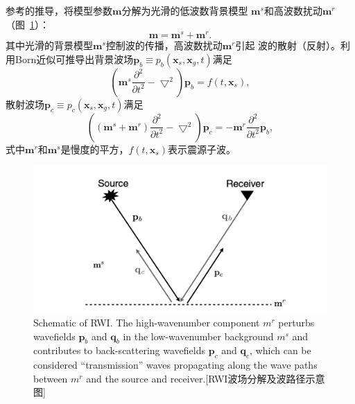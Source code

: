 参考的推导，将模型参数$\mathbf{m}$分解为光滑的低波数背景模型
$\mathbf{m}^s$和高波数扰动$\mathbf{m}^r$（图~\ref{fig:schematic_rwi}）：
\begin{equation}
	\mathbf{m}=\mathbf{m}^s+\mathbf{m}^r.
\end{equation}
其中光滑的背景模型$\mathbf{m}^s$控制波的传播，高波数扰动$\mathbf{m}^r$引起
波的散射（反射）。利用Born近似可推导出背景波场$\mathbf{p}_b
\equiv p_b(\mathbf{x}_s,\mathbf{x}_g,t)$满足
\begin{equation}
	\left(\mathbf{m}^s\frac{\partial^2}{\partial t^2}-\bigtriangledown^2\right)\mathbf{p}_b
	=f(t,\mathbf{x}_s),
\end{equation}
散射波场$\mathbf{p}_c\equiv p_c(\mathbf{x}_s,\mathbf{x}_g,t)$满足
\begin{equation}
	\left((\mathbf{m}^s+\mathbf{m}^r)\frac{\partial^2}{\partial t^2}-\bigtriangledown^2\right)
	\mathbf{p}_c=-\mathbf{m}^r\frac{\partial^2}{\partial t^2}\mathbf{p}_b,
\end{equation}
式中$\mathbf{m}^r$和$\mathbf{m}^s$是慢度的平方，$f(t,\mathbf{x}_s)$表示震源子波。

\begin{figure}[!htbp]
	\centering
	\includegraphics[width=0.7\linewidth]{figure/schematic_rwi}
	{Schematic of RWI. The high-wavenumber component
	$m^r$ perturbs wavefields $\mathbf{p}_b$ and $\mathbf{q}_b$ in the
	low-wavenumber background $m^s$ and contributes to back-scattering
	wavefields $\mathbf{p}_c$ and $\mathbf{q}_c$, which can be considered
	“transmission” waves propagating along the wave paths between $m^r$ and
	the source and receiver.}[RWI波场分解及波路径示意图]
	\label{fig:schematic_rwi}
\end{figure}

